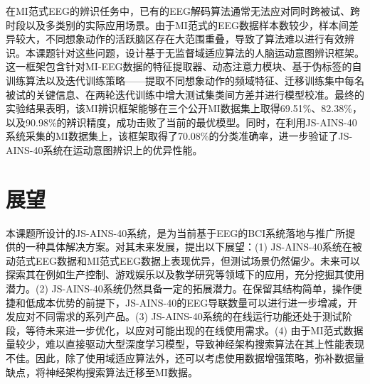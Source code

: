 在MI范式EEG的辨识任务中，已有的EEG解码算法通常无法应对同时跨被试、跨时段以及多类别的实际应用场景。由于MI范式的EEG数据样本数较少，样本间差异较大，不同想象动作的活跃脑区存在大范围重叠，导致了算法难以进行有效辨识。本课题针对这些问题，设计基于无监督域适应算法的人脑运动意图辨识框架。这一框架包含针对MI-EEG数据的特征提取器、动态注意力模块、基于伪标签的自训练算法以及迭代训练策略——提取不同想象动作的频域特征、迁移训练集中每名被试的关键信息、在两轮迭代训练中增大测试集类间方差并进行模型校准。最终的实验结果表明，该MI辨识框架能够在三个公开MI数据集上取得69.51\%、82.38\%，以及90.98\%的辨识精度，成功击败了当前的最优模型。同时，在利用JS-AINS-40系统采集的MI数据集上，该框架取得了70.08\%的分类准确率，进一步验证了JS-AINS-40系统在运动意图辨识上的优异性能。

\section{展望}

本课题所设计的JS-AINS-40系统，是为当前基于EEG的BCI系统落地与推广所提供的一种具体解决方案。对其未来发展，提出以下展望：(1) JS-AINS-40系统在被动范式EEG数据和MI范式EEG数据上表现优异，但测试场景仍然偏少。未来可以探索其在例如生产控制、游戏娱乐以及教学研究等领域下的应用，充分挖掘其使用潜力。(2) JS-AINS-40系统仍然具备一定的拓展潜力。在保留其结构简单，操作便捷和低成本优势的前提下，JS-AINS-40的EEG导联数量可以进行进一步增减，开发应对不同需求的系列产品。(3) JS-AINS-40系统的在线运行功能还处于测试阶段，等待未来进一步优化，以应对可能出现的在线使用需求。(4) 由于MI范式数据量较少，难以直接驱动大型深度学习模型，导致神经架构搜索算法在其上性能表现不佳。因此，除了使用域适应算法外，还可以考虑使用数据增强策略，弥补数据量缺点，将神经架构搜索算法迁移至MI数据。



